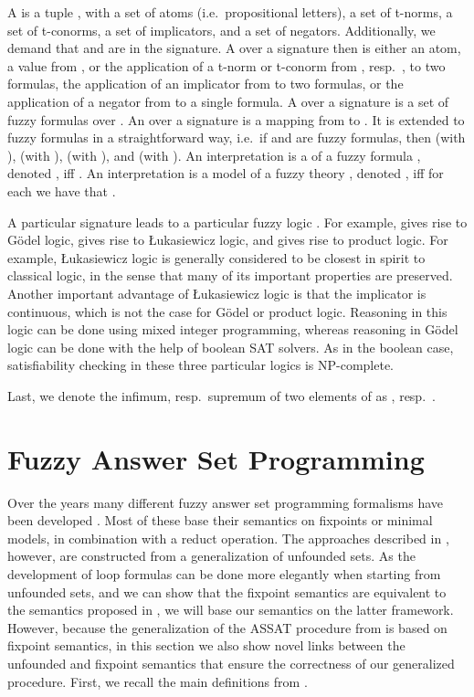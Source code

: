 \documentclass{tlp}
\begin{document}
A  is a tuple , with  a set of atoms (i.e.~propositional letters),  a set of t-norms,  a set of t-conorms,  a set of implicators, and  a set of negators. Additionally, we demand that  and  are in the signature. A  over a signature  then is either an atom, a value from , or the application of a t-norm or t-conorm from , resp.~, to two formulas, the application of an implicator from  to two formulas, or the application of a negator from  to a single formula. A  over a signature  is a set of fuzzy formulas over . An   over a signature  is a mapping from  to . It is extended to fuzzy formulas in a straightforward way, i.e.~if  and  are fuzzy formulas, then  (with ),  (with ),  (with ), and  (with ). An interpretation  is a  of a fuzzy formula , denoted , iff . An interpretation  is a model of a fuzzy theory , denoted , iff for each  we have that .

A particular signature leads to a particular fuzzy logic \cite{Hajek98}. For example,      gives rise to G\"odel logic,      gives rise to \L ukasiewicz logic, and      gives rise to product logic. For example, \L ukasiewicz logic is generally considered to be closest in spirit to classical logic, in the sense that many of its important properties are preserved. Another important advantage of \L ukasiewicz logic is that the implicator is continuous, which is not the case for G\"odel or product logic. Reasoning in this logic can be done using mixed integer programming, whereas reasoning in G\"odel logic can be done with the help of boolean SAT solvers. As in the boolean case, satisfiability checking in these three particular logics is NP-complete.

Last, we denote the infimum, resp.~supremum of two elements of  as , resp.~.




\section{Fuzzy Answer Set Programming}\label{sec:FASP}



Over the years many different fuzzy answer set programming formalisms have been developed \cite{Luka06,LukaStraccia07,MadridOjeda-Aciego-2008a,MadridAciego2009,Saad-2009,Straccia:reasoningweb,FASP:amai}. Most of these base their semantics on fixpoints or minimal models, in combination with a reduct operation. The approaches described in \cite{loyer:epistemic,FASP:amai}, however, are constructed from a generalization of unfounded sets. As the development of loop formulas can be done more elegantly when starting from unfounded sets, and we can show that the fixpoint semantics are equivalent to the semantics proposed in \cite{FASP:amai}, we will base our semantics on the latter framework. However, because the generalization of the ASSAT procedure from \cite{assat-linzhao} is based on fixpoint semantics, in this section we also show novel links between the unfounded and fixpoint semantics that ensure the correctness of our generalized procedure. 
First, we recall the main definitions from \cite{FASP:amai}.
\end{document}
